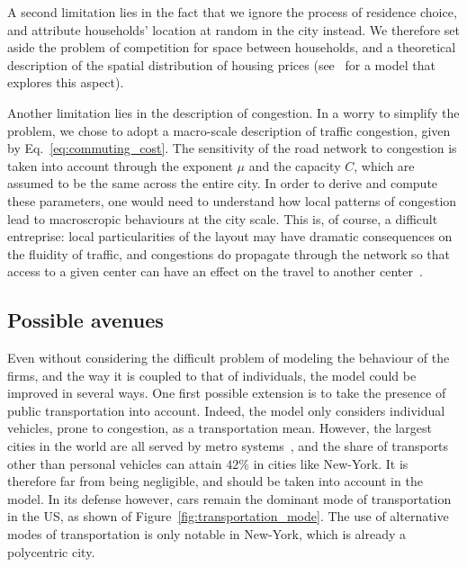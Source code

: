 A second limitation lies in the fact that we ignore the process of residence
choice, and attribute households' location at random in the city instead. We
therefore set aside the problem of competition for space between households, and
a theoretical description of the spatial distribution of housing prices
(see~\cite{Gauvin:2013} for a model that explores this aspect).

Another limitation lies in the description of congestion. In a worry to
simplify the problem, we chose to adopt a macro-scale description of
traffic congestion, given by Eq.~\ref{eq:commuting_cost}. The sensitivity of the
road network to congestion is taken into account through the exponent $\mu$ and
the capacity $C$, which are assumed to be the same across the entire city. In
order to derive and compute these parameters, one would need to understand how local
patterns of congestion lead to macroscropic behaviours at the city scale. This
is, of course, a difficult entreprise:  local particularities of the layout may
have dramatic consequences on the fluidity of traffic, and congestions do
propagate through the network so that access to a given center can have an
effect on the travel to another center~\cite{Li:2015}. 

\subsection{Possible avenues}
\label{sub:possible_avenues}

Even without considering the difficult problem of modeling the behaviour of the
firms, and the way it is coupled to that of individuals, the model could be
improved in several ways. 
One first possible extension is to take the presence of public transportation
into account. Indeed, the model only considers individual vehicles, prone to
congestion, as a transportation mean.  However, the largest cities in the world
are all served by metro systems~\cite{Roth:2012}, and the share of transports
other than personal vehicles can attain $42\%$ in cities like New-York. It is therefore far from
being negligible, and should be taken into account in the model. In its defense 
however, cars remain the dominant mode of transportation in the US, as shown of
Figure~\ref{fig:transportation_mode}. The use of alternative modes of
transportation is only notable in New-York, which is already a polycentric
city.\\

